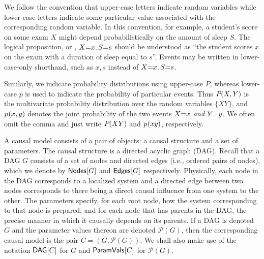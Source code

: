 We follow the convention that upper-case letters indicate random variables while lower-case letters indicate some particular value associated with the corresponding random variable. In this convention, for example, a student's score on some exam $X$ might depend probabilistically on the amount of sleep $S$. The logical proposition, or , $X\mathord{=}x,S\mathord{=}s$ should be understood as ``the student scores $x$ on the exam with a duration of sleep equal to $s$''. Events may be written in lower-case-only shorthand, such as $x,s$ instead of $X\mathord{=}x,S\mathord{=}s$.

Similarly, we indicate probability distributions using upper-case $P$, whereas lower-case $p$ is used to indicate the probability of particular events. Thus ${P_{}}\lparen X, Y\rparen$ is the multivariate probability distribution over the random variables $\{X Y\}$, and ${p_{}}\lparen x, y\rparen$ denotes the joint probability of the two events $X\mathord{=}x$ \emph{and} $Y\mathord{=}y$. We often omit the comma and just write ${P_{}}\lparen X Y\rparen$ and ${p_{}}\lparen x y\rparen$, respectively.


\color{red}


A causal model consists of a pair of objects: a causal structure and a set of parameters.  The causal structure is a directed acyclic graph (DAG).  Recall that a DAG $G$ consists of a set of nodes and directed edges (i.e., ordered pairs of nodes), which we denote by ${\operatorname{\mathsf{Nodes}}_{}}\lbrack G\rbrack$ and ${\operatorname{\mathsf{Edges}}_{}}\lbrack G\rbrack$ respectively.  Physically, each node in the DAG corresponds to a localized system and a directed edge between two nodes corresponds to there being a direct causal influence from one system to the other.  The parameters specify, for each root node, how the system corresponding to that node is prepared, and for each node that has parents in the DAG, the precise manner in which it causally depends on its parents.  If a DAG is denoted $G$ and the parameter values thereon are denoted $\mathcal{P}(G)$, then the corresponding causal model is the pair $C = (G,\mathcal{P}(G))$.  We shall also make use of the notation ${\operatorname{\mathsf{DAG}}_{}}\lbrack C\rbrack$ for $G$ and ${\operatorname{\mathsf{ParamVals}}_{}}\lbrack C\rbrack$ for $\mathcal{P}(G)$.

